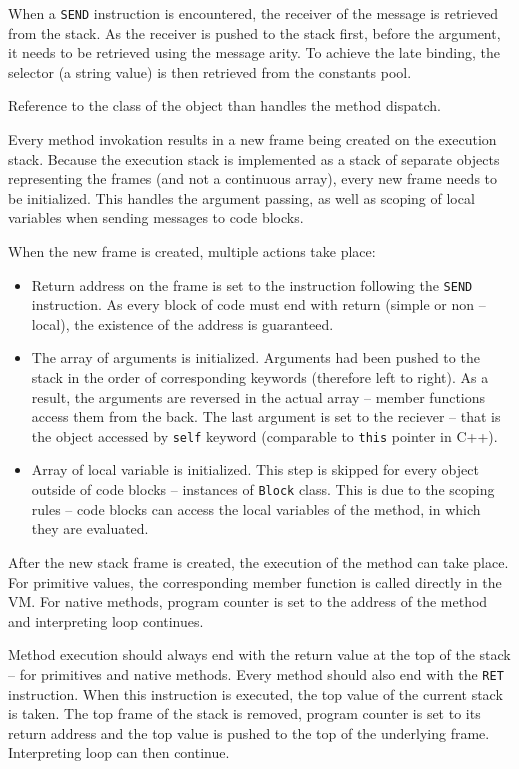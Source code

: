 \documentclass[thesis=M,english]{FITthesis}[2019/12/23]
\begin{document}
When a \texttt{SEND} instruction is encountered, the receiver of the message is retrieved from the stack. As the receiver is pushed to the stack
first, before the argument, it needs to be retrieved using the message arity. To achieve the late binding, the selector (a string value)
is then retrieved from the constants pool. 

Reference to the class of the object than handles the method dispatch.

Every method invokation results in a new frame being created on the execution stack. Because the execution stack is implemented as a
stack of separate objects representing the frames (and not a continuous array), every new frame needs to be initialized. This handles
the argument passing, as well as scoping of local variables when sending messages to code blocks.

When the new frame is created, multiple actions take place:
\begin{itemize}
	\item Return address on the frame is set to the instruction following the \texttt{SEND} instruction. As every block of code must end
		with return (simple or non -- local), the existence of the address is guaranteed.
	\item The array of arguments is initialized. Arguments had been pushed to the stack in the order of corresponding keywords (therefore
		left to right). As a result, the arguments are reversed in the actual array -- member functions access them from the back. The
		last argument is set to the reciever -- that is the object accessed by \texttt{self} keyword (comparable to \texttt{this} pointer in
		C++).
	\item Array of local variable is initialized. This step is skipped for every object outside of code blocks -- instances of \texttt{Block}
		class. This is due to the scoping rules -- code blocks can access the local variables of the method, in which they are evaluated.
\end{itemize}

After the new stack frame is created, the execution of the method can take place. For primitive values, the corresponding member function
is called directly in the VM. For native methods, program counter is set to the address of the method and interpreting loop continues.

Method execution should always end with the return value at the top of the stack -- for primitives and native methods. Every method
should also end with the \texttt{RET} instruction. When this instruction is executed, the top value of the current stack is taken.
The top frame of the stack is removed, program counter is set to its return address and the top value is pushed to the top of the
underlying frame. Interpreting loop can then continue.
\end{document}
